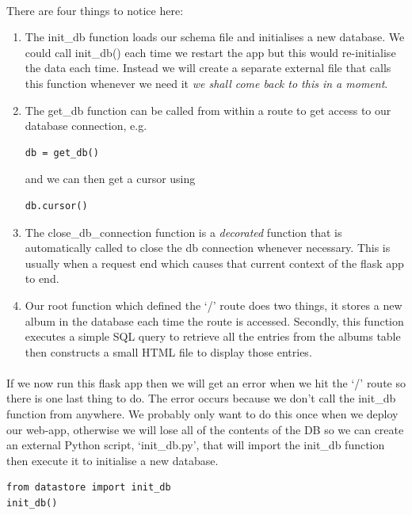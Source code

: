 \documentclass[12pt, a4paper, twoside]{book}
\begin{document}
\paragraph{} There are four things to notice here:

\begin{enumerate}
\item The init\_db function loads our schema file and initialises a new database. We could call init\_db() each time we restart the app but this would re-initialise the data each time. Instead we will create a separate external file that calls this function whenever we need it \emph{we shall come back to this in a moment}.
\item The get\_db function can be called from within a route to get access to our database connection, e.g.
\begin{lstlisting}[style=DOS]
db = get_db()
\end{lstlisting}
and we can then get a cursor using
\begin{lstlisting}[style=DOS]
db.cursor()
\end{lstlisting}
\item The close\_db\_connection function is a \emph{decorated} function that is automatically called to close the db connection whenever necessary. This is usually when a request end which causes that current context of the flask app to end.
\item Our root function which defined the `/' route does two things, it stores a new album in the database each time the route is accessed. Secondly, this function executes a simple SQL query to retrieve all the entries from the albums table then constructs a small HTML file to display those entries. 
\end{enumerate}

\paragraph{} If we now run this flask app then we will get an error when we hit the `/' route so there is one last thing to do. The error occurs because we don't call the init\_db function from anywhere. We probably only want to do this once when we deploy our web-app, otherwise we will lose all of the contents of the DB so we can create an external Python script, `init\_db.py', that will import the init\_db function then execute it to initialise a new database.

\begin{lstlisting}
from datastore import init_db
init_db()
\end{lstlisting}
\end{document}
